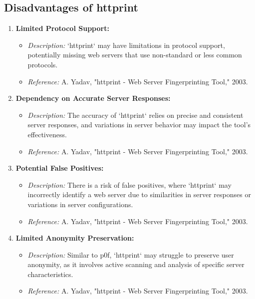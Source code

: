 \documentclass[11pt]{article}
\begin{document}
\subsection{Disadvantages of httprint}

\begin{enumerate}
    \item \textbf{Limited Protocol Support:}
    \begin{itemize}
        \item \textit{Description:} `httprint` may have limitations in protocol support, potentially missing web servers that use non-standard or less common protocols.
        \item \textit{Reference:} A. Yadav, "httprint - Web Server Fingerprinting Tool," 2003.
    \end{itemize}

    \item \textbf{Dependency on Accurate Server Responses:}
    \begin{itemize}
        \item \textit{Description:} The accuracy of `httprint` relies on precise and consistent server responses, and variations in server behavior may impact the tool's effectiveness.
        \item \textit{Reference:} A. Yadav, "httprint - Web Server Fingerprinting Tool," 2003.
    \end{itemize}

    \item \textbf{Potential False Positives:}
    \begin{itemize}
        \item \textit{Description:} There is a risk of false positives, where `httprint` may incorrectly identify a web server due to similarities in server responses or variations in server configurations.
        \item \textit{Reference:} A. Yadav, "httprint - Web Server Fingerprinting Tool," 2003.
    \end{itemize}

    \item \textbf{Limited Anonymity Preservation:}
    \begin{itemize}
        \item \textit{Description:} Similar to p0f, `httprint` may struggle to preserve user anonymity, as it involves active scanning and analysis of specific server characteristics.
        \item \textit{Reference:} A. Yadav, "httprint - Web Server Fingerprinting Tool," 2003.
    \end{itemize}


\end{enumerate}
\end{document}
